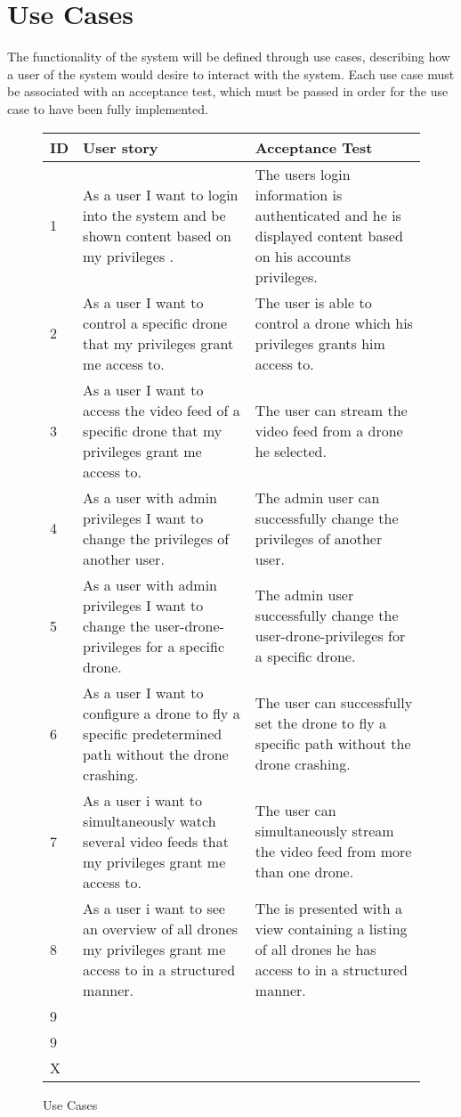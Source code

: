 \section{Use Cases}
The functionality of the system will be defined through use cases, describing how a user of the system would desire to interact with the system.
Each use case must be associated with an acceptance test, which must be passed in order for the use case to have been fully implemented.

\begin{figure}[H]
\begin{center}
\begin{tabular}{ | l | p{6cm} | p{6cm} | }
  \hline              
	\textbf{ID} & \textbf{User story} & \textbf{Acceptance Test} \\ \hline
	1 & As a user I want to login into the system and be shown content based on my privileges .& The users login information is authenticated and he is displayed content based on his accounts privileges.\\ \hline
	2 & As a user I want to control a specific drone that my privileges grant me access to. & The user is able to control a drone which his privileges grants him access to. \\ \hline
	3 & As a user I want to access the video feed of a specific drone that my privileges grant me access to. & The user can stream the video feed from a drone he selected.\\ \hline
	4 & As a user with admin privileges I want to change the privileges of another user. & The admin user can successfully change the privileges of another user. \\ \hline
	5 & As a user with admin privileges I want to change the user-drone-privileges for a specific drone. & The admin user successfully change the user-drone-privileges for a specific drone. \\ \hline
	6 & As a user I want to configure a drone to fly a specific predetermined path without the drone crashing. & The user can successfully set the drone to fly a specific path without the drone crashing. \\ \hline
	7 & As a user i want to simultaneously watch several video feeds that my privileges grant me access to. & The user can simultaneously stream the video feed from more than one drone. \\ \hline
	8 & As a user i want to see an overview of all drones my privileges grant me access to in a structured manner. &  The is presented with a view containing a listing of all drones he has access to in a structured manner.\\ \hline
	9 & &  \\ \hline
	9 & &  \\ \hline
	X & &  \\ 
  \hline  
\end{tabular}

\caption{Use Cases}
\label{tab:use_cases}
\end{center}
\end{figure}